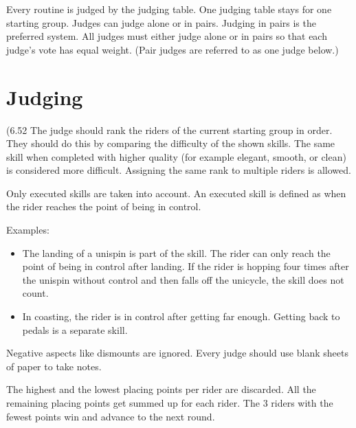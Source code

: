Every routine is judged by the judging table.
One judging table stays for one starting group.
Judges can judge alone or in pairs.
Judging in pairs is the preferred system.
All judges must either judge alone or in pairs so that each judge's vote has equal weight.
(Pair judges are referred to as one judge below.)

\section{Judging}

\oldrule({6.52}
The judge should rank the riders of the current starting group in order.
They should do this by comparing the difficulty of the shown skills.
The same skill when completed with higher quality (for example elegant, smooth, or clean) is considered more difficult.
Assigning the same rank to multiple riders is allowed.

Only executed skills are taken into account.
An executed skill is defined as when the rider reaches the point of being in control.

Examples:
\begin{itemize}
\item The landing of a unispin is part of the skill.
The rider can only reach the point of being in control after landing.
If the rider is hopping four times after the unispin without control and then falls off the unicycle, the skill does not count.
\item In coasting, the rider is in control after getting far enough.
Getting back to pedals is a separate skill.
\end{itemize}

Negative aspects like dismounts are ignored.
Every judge should use blank sheets of paper to take notes.

The highest and the lowest placing points per rider are discarded.
All the remaining placing points get summed up for each rider.
The 3 riders with the fewest points win and advance to the next round.
